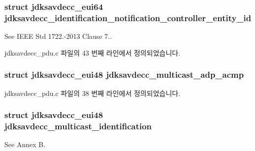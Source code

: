\subsubsection[{\texorpdfstring{jdksavdecc\+\_\+identification\+\_\+notification\+\_\+controller\+\_\+entity\+\_\+id}{jdksavdecc_identification_notification_controller_entity_id}}]{\setlength{\rightskip}{0pt plus 5cm}struct {\bf jdksavdecc\+\_\+eui64} jdksavdecc\+\_\+identification\+\_\+notification\+\_\+controller\+\_\+entity\+\_\+id}\hypertarget{group__pdu_gad850df91f1465281853a40125c5aa663}{}\label{group__pdu_gad850df91f1465281853a40125c5aa663}
See I\+E\+EE Std 1722.-\/2013 Clause 7.. 

jdksavdecc\+\_\+pdu.\+c 파일의 43 번째 라인에서 정의되었습니다.

\subsubsection[{\texorpdfstring{jdksavdecc\+\_\+multicast\+\_\+adp\+\_\+acmp}{jdksavdecc_multicast_adp_acmp}}]{\setlength{\rightskip}{0pt plus 5cm}struct {\bf jdksavdecc\+\_\+eui48} jdksavdecc\+\_\+multicast\+\_\+adp\+\_\+acmp}\hypertarget{group__pdu_ga151652dc8a9ab46279afe5930fe815d5}{}\label{group__pdu_ga151652dc8a9ab46279afe5930fe815d5}


jdksavdecc\+\_\+pdu.\+c 파일의 38 번째 라인에서 정의되었습니다.

\subsubsection[{\texorpdfstring{jdksavdecc\+\_\+multicast\+\_\+identification}{jdksavdecc_multicast_identification}}]{\setlength{\rightskip}{0pt plus 5cm}struct {\bf jdksavdecc\+\_\+eui48} jdksavdecc\+\_\+multicast\+\_\+identification}\hypertarget{group__pdu_ga43136b2dc4b8d4d37572d335a27503f3}{}\label{group__pdu_ga43136b2dc4b8d4d37572d335a27503f3}
See Annex B. 

